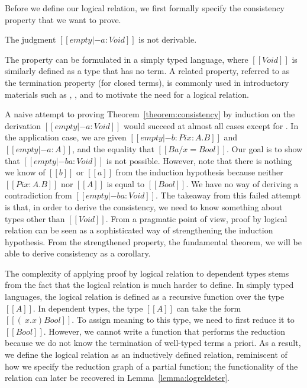 \documentclass[acmsmall,screen=true,
\ifpublic review=false\else,review=true\fi
  ,anonymous=\ifanonymous true\else false\fi]{acmart}
\begin{document}
Before we define our logical relation, we first formally specify the
consistency property that we want to prove.
\begin{theorem}
  \label{theorem:consistency}
  The judgment $[[empty |- a : Void ]]$ is not derivable.
\end{theorem}
The property can be formulated in a simply typed language, where
$[[Void]]$ is similarly defined as a type that has no term. A related
property, referred to as the termination property (for closed terms),
is commonly used in introductory materials such as
\citet{skorstengaard2019introduction}, \citet{pierce2002types}, and
\citet{harpertait} to motivate the need for a logical relation.

A naive attempt to proving Theorem~\ref{theorem:consistency} by
induction on the derivation $[[empty |- a : Void]]$ would succeed at
almost all cases except for . In the application
case, we are given $[[empty |- b : Pi x : A . B]]$ and $[[empty |- a : A]]$, and
the equality that $[[B {a / x} = Bool]]$. Our goal is to show that
$[[empty |- b a : Void]]$ is not possible. However, note that there is
nothing we know of $[[b]]$ or $[[a]]$ from the induction hypothesis
because neither $[[Pi x : A . B]]$ nor $[[A]]$ is equal to $[[Bool]]$.
We have no way of deriving a contradiction from $[[empty |- b a :
Void]]$. The takeaway from this failed attempt is that, in order to
derive the consistency, we need to know something about types other
than $[[Void]]$. From a pragmatic point of view, proof by logical
relation can be seen as a sophisticated way of strengthening the
induction hypothesis. From the strengthened property, the fundamental
theorem, we will be able to derive consistency as a corollary.

The complexity of applying proof by logical relation to dependent types stems
from the fact that the logical relation is much harder to define. In
simply typed languages, the logical relation is defined as a recursive
function over the type $[[A]]$.
In dependent types, the type
$[[A]]$ can take the form $[[(\ x . x ) Bool]]$. To assign meaning to
this type, we need to first reduce it to $[[Bool]]$. However, we
cannot write a function that performs the reduction because we do not
know the termination of well-typed terms a priori. As a result, we
define the logical relation as an inductively defined relation,
reminiscent of how we specify the reduction graph of a partial
function; the functionality of the relation can later be recovered in Lemma~\ref{lemma:logreldeter}.
\end{document}
